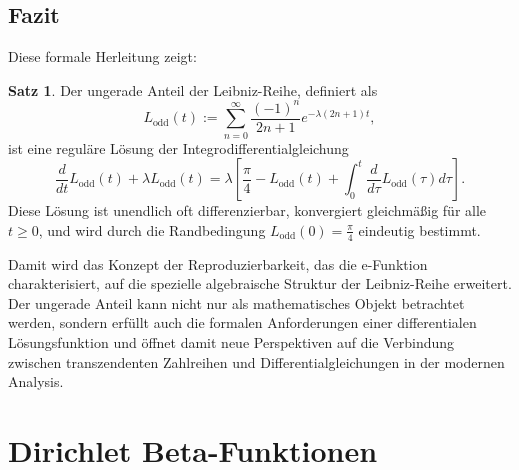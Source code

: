 \documentclass[a4paper,12pt,twoside]{report}
\theoremstyle{definition}
\newtheorem{satz}{Satz}
\begin{document}
\subsection{Fazit}

Diese formale Herleitung zeigt:

\begin{satz}
	Der ungerade Anteil der Leibniz-Reihe, definiert als
	$$L_{\text{odd}}(t) := \sum_{n=0}^{\infty} \frac{(-1)^n}{2n+1} e^{-\lambda(2n+1)t},$$
	ist eine reguläre Lösung der Integrodifferentialgleichung
	$$\frac{d}{dt} L_{\text{odd}}(t) + \lambda L_{\text{odd}}(t) = \lambda \left[ \frac{\pi}{4} - L_{\text{odd}}(t) + \int_0^t \frac{d}{d\tau} L_{\text{odd}}(\tau) d\tau \right].$$
	Diese Lösung ist unendlich oft differenzierbar, konvergiert gleichmäßig für alle $t \geq 0$, und wird durch die Randbedingung $L_{\text{odd}}(0) = \frac{\pi}{4}$ eindeutig bestimmt.
\end{satz}

Damit wird das Konzept der Reproduzierbarkeit, das die e-Funktion charakterisiert, auf die spezielle algebraische Struktur der Leibniz-Reihe erweitert. Der ungerade Anteil kann nicht nur als mathematisches Objekt betrachtet werden, sondern erfüllt auch die formalen Anforderungen einer differentialen Lösungsfunktion und öffnet damit neue Perspektiven auf die Verbindung zwischen transzendenten Zahlreihen und Differentialgleichungen in der modernen Analysis.

\section{Dirichlet Beta-Funktionen}
\end{document}
